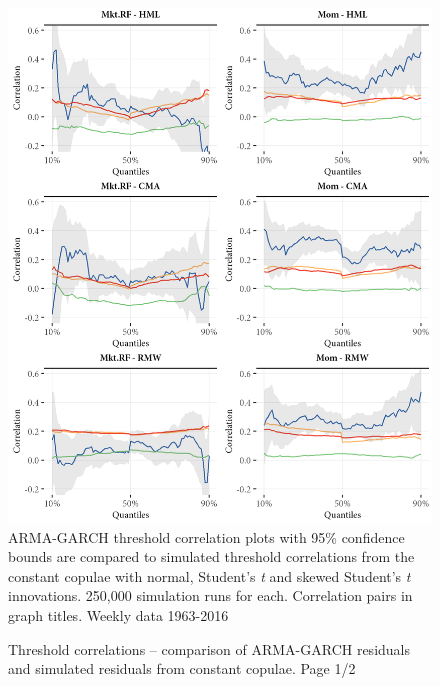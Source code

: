\begin{figure}[htbp]
  \caption{Threshold correlations -- comparison of ARMA-GARCH residuals and simulated residuals from constant copulae. Page 1/2}
  \label{fig:threshold_simulated1}
  \centering
  \begin{minipage}{\textwidth}
  \includegraphics[scale=1]{graphics/threshold_simulated1.png}  
  \vspace{3mm}
  \footnotesize
  ARMA-GARCH threshold correlation plots with 95\% confidence bounds are compared to simulated threshold correlations from the constant copulae with normal, Student's \textit{t} and skewed Student's \textit{t} innovations. 250,000 simulation runs for each. Correlation pairs in graph titles. Weekly data 1963-2016
  \end{minipage}
\end{figure}
